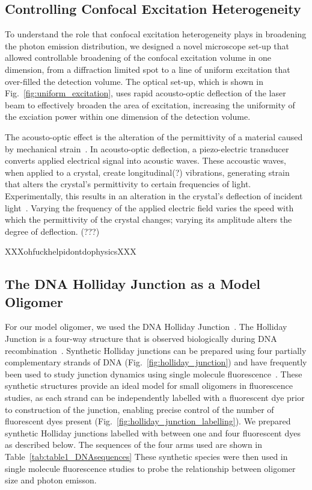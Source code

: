 \subsection{Controlling Confocal Excitation Heterogeneity}
To understand the role that confocal excitation heterogeneity plays in broadening the photon emission distribution, we designed a novel microscope set-up that allowed controllable broadening of the confocal excitation volume in one dimension, from a diffraction limited spot to a line of uniform excitation that over-filled the detection volume. The optical set-up, which is shown in Fig.~\ref{fig:uniform_excitation}, uses rapid acousto-optic deflection of the laser beam to effectively broaden the area of excitation, increasing the uniformity of the exciation power within one dimension of the detection volume.

The acousto-optic effect is the alteration of the permittivity of a material caused by mechanical strain~\cite{???}. In acousto-optic deflection, a piezo-electric transducer converts applied electrical signal into acoustic waves.  These accoustic waves, when applied to a crystal, create longitudinal(?) vibrations, generating strain that alters the crystal's permittivity to certain frequencies of light. Experimentally, this results in an alteration in the crystal's deflection of incident light~\cite{???}. Varying the frequency of the applied electric field varies the speed with which the permittivity of the crystal changes; varying its amplitude alters the degree of deflection. (???)  

XXXohfuckhelpidontdophysicsXXX    


\subsection{The DNA Holliday Junction as a Model Oligomer}
For our model oligomer, we used the DNA Holliday Junction~\cite{holliday1964}. The Holliday Junction is a four-way structure that is observed biologically during DNA recombination~\cite{potter1976}. Synthetic Holliday junctions can be prepared using four partially complementary strands of DNA (Fig.~\ref{fig:holliday_junction}) and have frequently been used to study junction dynamics using single molecule fluorescence~\cite{mckinney03, uphoff2010, Hyeon2012}. These synthetic structures provide an ideal model for small oligomers in fluorescence studies, as each strand can be independently labelled with a fluorescent dye prior to construction of the junction, enabling precise control of the number of fluorescent dyes present (Fig.~\ref{fig:holliday_junction_labelling}). We prepared synthetic Holliday junctions labelled with between one and four fluorescent dyes as described below. The sequences of the four arms used are shown in Table~\ref{tab:table1_DNAsequences} These synthetic species were then used in single molecule fluorescence studies to probe the relationship between oligomer size and photon emisson.

